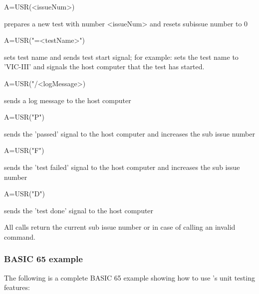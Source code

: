 \begin{screenoutput}
    A=USR(<issueNum>)
\end{screenoutput}
prepares a new test with number <issueNum> and resets subissue number to 0

\begin{screenoutput}
    A=USR("=<testName>")
\end{screenoutput}
sets test name and sends test start signal; for example:  
sets the test name to 'VIC-III' and signals the host computer that the test 
has started.

\begin{screenoutput}
    A=USR("/<logMessage>)
\end{screenoutput}
sends a log message to the host computer

\begin{screenoutput}
    A=USR("P")
\end{screenoutput}
sends the 'passed' signal to the host computer and increases the sub issue number

\begin{screenoutput}
    A=USR("F")
\end{screenoutput}
sends the 'test failed' signal to the host computer and increases 
the sub issue number

\begin{screenoutput}
    A=USR("D")
\end{screenoutput}
sends the 'test done' signal to the host computer 

All calls return the current sub issue number or  in 
case of calling an invalid command.

\subsubsection{BASIC 65 example}

The following is a complete BASIC 65 example showing how to use 's
unit testing features:

